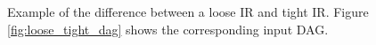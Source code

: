 \begin{figure}
\centering


\usebox{\measurebox}\qquad
    \begin{minipage}[][\ht\measurebox][c]{.26\textwidth}
       
    \end{minipage}
\caption{Example of the difference between a loose IR and tight IR. Figure \ref{fig:loose_tight_dag} shows the corresponding input DAG.} 
\label{fig:tight_loose}
\end{figure}

